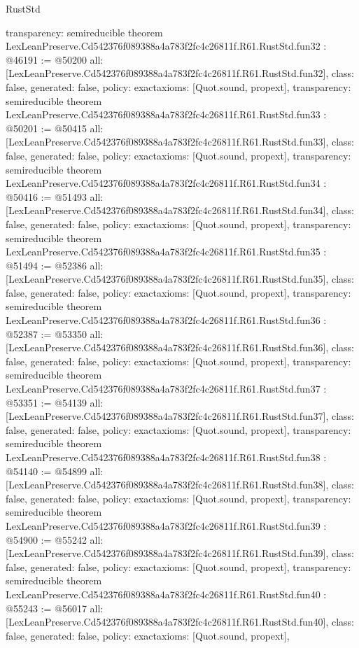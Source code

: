 \begin{lexlean}{RustStd}
\begin{coremodule}
{  transparency: semireducible
}
theorem LexLeanPreserve.Cd542376f089388a4a783f2fc4c26811f.R61.RustStd.fun32 : @46191 := @50200 {
  all: [LexLeanPreserve.Cd542376f089388a4a783f2fc4c26811f.R61.RustStd.fun32],
  class: false,
  generated: false,
  policy: exact{axioms: [Quot.sound, propext]},
  transparency: semireducible
}
theorem LexLeanPreserve.Cd542376f089388a4a783f2fc4c26811f.R61.RustStd.fun33 : @50201 := @50415 {
  all: [LexLeanPreserve.Cd542376f089388a4a783f2fc4c26811f.R61.RustStd.fun33],
  class: false,
  generated: false,
  policy: exact{axioms: [Quot.sound, propext]},
  transparency: semireducible
}
theorem LexLeanPreserve.Cd542376f089388a4a783f2fc4c26811f.R61.RustStd.fun34 : @50416 := @51493 {
  all: [LexLeanPreserve.Cd542376f089388a4a783f2fc4c26811f.R61.RustStd.fun34],
  class: false,
  generated: false,
  policy: exact{axioms: [Quot.sound, propext]},
  transparency: semireducible
}
theorem LexLeanPreserve.Cd542376f089388a4a783f2fc4c26811f.R61.RustStd.fun35 : @51494 := @52386 {
  all: [LexLeanPreserve.Cd542376f089388a4a783f2fc4c26811f.R61.RustStd.fun35],
  class: false,
  generated: false,
  policy: exact{axioms: [Quot.sound, propext]},
  transparency: semireducible
}
theorem LexLeanPreserve.Cd542376f089388a4a783f2fc4c26811f.R61.RustStd.fun36 : @52387 := @53350 {
  all: [LexLeanPreserve.Cd542376f089388a4a783f2fc4c26811f.R61.RustStd.fun36],
  class: false,
  generated: false,
  policy: exact{axioms: [Quot.sound, propext]},
  transparency: semireducible
}
theorem LexLeanPreserve.Cd542376f089388a4a783f2fc4c26811f.R61.RustStd.fun37 : @53351 := @54139 {
  all: [LexLeanPreserve.Cd542376f089388a4a783f2fc4c26811f.R61.RustStd.fun37],
  class: false,
  generated: false,
  policy: exact{axioms: [Quot.sound, propext]},
  transparency: semireducible
}
theorem LexLeanPreserve.Cd542376f089388a4a783f2fc4c26811f.R61.RustStd.fun38 : @54140 := @54899 {
  all: [LexLeanPreserve.Cd542376f089388a4a783f2fc4c26811f.R61.RustStd.fun38],
  class: false,
  generated: false,
  policy: exact{axioms: [Quot.sound, propext]},
  transparency: semireducible
}
theorem LexLeanPreserve.Cd542376f089388a4a783f2fc4c26811f.R61.RustStd.fun39 : @54900 := @55242 {
  all: [LexLeanPreserve.Cd542376f089388a4a783f2fc4c26811f.R61.RustStd.fun39],
  class: false,
  generated: false,
  policy: exact{axioms: [Quot.sound, propext]},
  transparency: semireducible
}
theorem LexLeanPreserve.Cd542376f089388a4a783f2fc4c26811f.R61.RustStd.fun40 : @55243 := @56017 {
  all: [LexLeanPreserve.Cd542376f089388a4a783f2fc4c26811f.R61.RustStd.fun40],
  class: false,
  generated: false,
  policy: exact{axioms: [Quot.sound, propext]},
}
\end{coremodule}
\end{lexlean}
